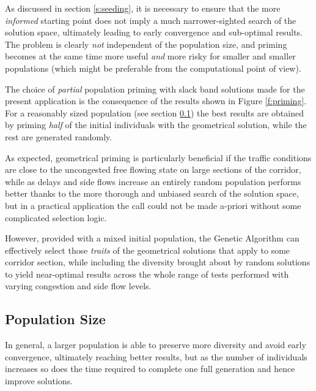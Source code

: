 As discussed in section \ref{s:seeding}, it is necessary to ensure that the more \emph{informed} starting point does not imply a much narrower-sighted search of the solution space, ultimately leading to early convergence and sub-optimal results. The problem is clearly \emph{not} independent of the population size, and priming becomes at the same time more useful \emph{and} more risky for smaller and smaller populations (which might be preferable from the computational point of view).

The choice of \emph{partial} population priming with slack band solutions made for the present application is the consequence of the results shown in Figure \ref{f:priming}. For a reasonably sized population (see section \ref{r:popsize}) the best results are obtained by priming \emph{half} of the initial individuals with the geometrical solution, while the rest are generated randomly. 


As expected, geometrical priming is particularly beneficial if the traffic conditions are close to the uncongested free flowing state on large sections of the corridor, while as delays and side flows increase an entirely random population performs better thanks to the more thorough and unbiased search of the solution space, but in a practical application the call could not be made a-priori without some complicated selection logic.

However, provided with a mixed initial population, the Genetic Algorithm can effectively select those \emph{traits} of the geometrical solutions that apply to some corridor section, while including the diversity brought about by random solutions to yield near-optimal results across the whole range of tests performed with varying congestion and side flow levels.

\subsection{Population Size} \label{r:popsize}
In general, a larger population is able to preserve more diversity and avoid early convergence, ultimately reaching better results, but as the number of individuals increases so does the time required to complete one full generation and hence  improve solutions.

